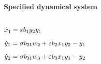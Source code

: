
\begin{math}
\end{math}
\paragraph{Specified dynamical system}
\begin{math}
\end{math}\par

\begin{math}
\dot x_{1}=\varepsilon b_{1} y_{2} y_{1}
\end{math}\par

\begin{math}
\dot y_{1}=\sigma  b_{21} w_{2}+\varepsilon b_{2} x_{1} y_{2}-y_{1}
\end{math}\par

\begin{math}
\dot y_{2}=\sigma  b_{31} w_{3}+\varepsilon b_{3} x_{1} y_{1}-y_{2}
\end{math}\par
